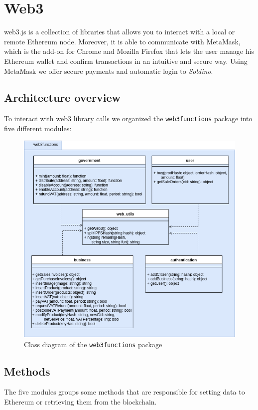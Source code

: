 \section{Web3} 
web3.js is a collection of libraries that allows you to interact with a local or remote Ethereum node. Moreover, it is able to communicate with MetaMask, which is the add-on for Chrome and Mozilla Firefox that lets the user manage his Ethereum wallet and confirm transactions in an intuitive and secure way. Using MetaMask we offer secure payments and automatic login to \textit{Soldino}.
\subsection{Architecture overview}
To interact with web3 library calls we organized the \texttt{web3functions} package into five different modules:
\begin{figure}[h]
	\centering
	\includegraphics[scale=0.65]{res/images/web3.png}
	\caption{Class diagram of the \texttt{web3functions} package}
\end{figure}
\subsection{Methods}

The five modules groups some methods that are responsible for setting data to Ethereum or retrieving them from the blockchain.

